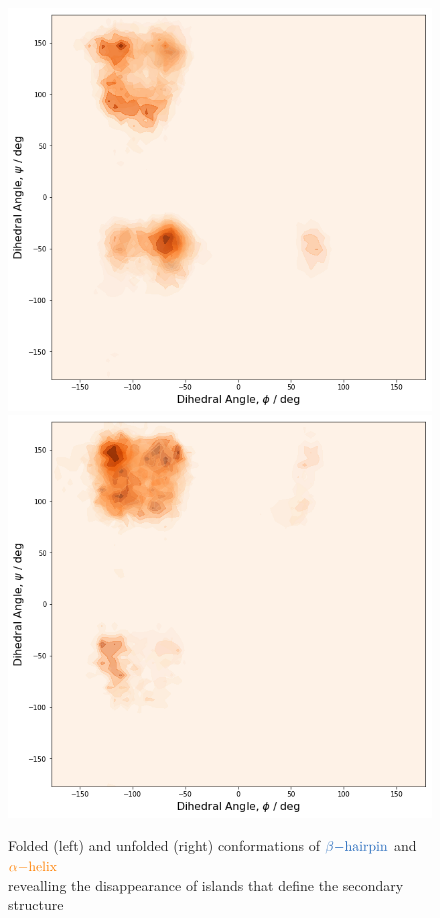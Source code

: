 \documentclass{article}[12pt]
\numberwithin{equation}{section}
\begin{document}
\begin{figure}[H]
	\includegraphics[scale=0.3]{dihedrals-3}
	\includegraphics[scale=0.3]{dihedrals-4}
\caption{Folded (left) and unfolded (right) conformations of
$\color{NavyBlue}{\beta\mathrm{-hairpin}}$ and $\color{orange}{\alpha\mathrm{-helix}}$\\
revealling the disappearance of islands that define the secondary structure}
\label{fig:ramachandran}
\end{figure}
\end{document}
